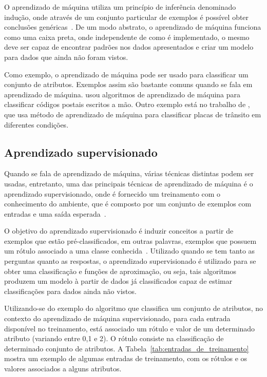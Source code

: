 O aprendizado de máquina utiliza um princípio de inferência denominado
indução, onde através de um conjunto particular de exemplos é possível
obter conclusões genéricas~\cite{bruno2010aprendizadomaquina}. De um modo
abstrato, o aprendizado de máquina funciona como uma caixa preta, onde
independente de como é implementado, o mesmo deve ser capaz de encontrar padrões
nos dados apresentados e criar um modelo para dados que ainda não foram vistos.

Como exemplo, o aprendizado de máquina pode ser usado para classificar
um conjunto de atributos. Exemplos assim são bastante comuns quando se fala em
aprendizado de máquina.  usou algoritmos de
aprendizado de máquina para classificar códigos postais escritos a mão. Outro
exemplo está no trabalho de , que usa método de
aprendizado de máquina para classificar placas de trânsito em diferentes
condições.


\subsection{Aprendizado supervisionado}

Quando se fala de aprendizado de máquina, várias técnicas distintas podem ser
usadas, entretanto, uma das principais técnicas de aprendizado de máquina é o aprendizado
supervisionado, onde é fornecido um treinamento com o conhecimento do
ambiente, que é composto por um conjunto de exemplos com entradas
e uma saída esperada~\cite{bruno2010aprendizadomaquina}.

O objetivo do aprendizado supervisionado é induzir conceitos a partir de
exemplos que estão pré-classificados, em outras palavras, exemplos que
possuem um rótulo associado a uma classe conhecida~\cite{bruno2010aprendizadomaquina}.
Utilizado quando se tem tanto as perguntas quanto as respostas, o aprendizado
supervisionado é utilizado para se obter uma classificação e funções de aproximação, ou seja,
tais algoritmos produzem um modelo à partir de dados já classificados capaz de estimar classificações
para dados ainda não vistos.

Utilizando-se do exemplo do algoritmo que classifica um conjunto de atributos,
no contexto do aprendizado de máquina supervisionado, para cada entrada
disponível no treinamento, está associado um rótulo e valor de um determinado
atributo (variando entre 0,1 e 2). O rótulo consiste na classificação de
determinado conjunto de atributos. A Tabela~\ref{tab:entradas_de_treinamento}
mostra um exemplo de algumas entradas de treinamento, com os rótulos e os
valores associados a alguns atributos.

